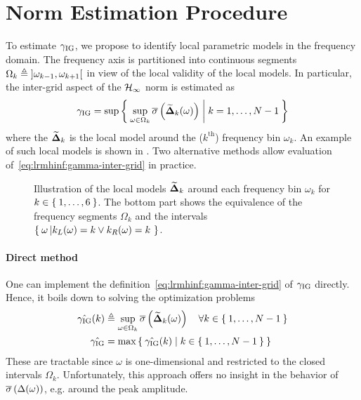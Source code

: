 \section{\Hinf{} Norm Estimation Procedure}
\label{sec:lrmhinf:LPMHinf}
To estimate $\gamma_{\mathrm{IG}}$, we propose to identify local parametric models in the frequency domain.
The frequency axis is partitioned into continuous segments $\Omega_k \triangleq \left]  \omega_{k-1} , \omega_{k+1}  \right[$ in view of the local validity of the local models.
In particular, the inter-grid aspect of the $\mathcal{H}_{\infty}$ norm is estimated as
\begin{equation}
  \gamma_{\mathrm{IG}} = 
    \sup \Set{ 
                \sup_{\omega \in \Omega_k} \ensuremath{ \overline{\sigma} \left( \widetilde{\mathbf{\Delta}}_k(\omega) \right) }
                |
                k = 1,\ldots,N-1
                }
   \label{eq:lrmhinf:gamma-inter-grid}
\end{equation}
where the $\widetilde{\mathbf{\Delta}}_{k}$ is the local model around the ($k^{\text{th}}$) frequency bin $\omega_k$.
An example of such local models is shown in .
Two alternative methods allow evaluation of~\eqref{eq:lrmhinf:gamma-inter-grid} in practice.

\begin{figure}
  \centering
  \setlength{\figurewidth}{0.68\columnwidth}
  \setlength{\figureheight}{0.68\figurewidth}
  
  \caption[Illustration of the local models.]{Illustration of the local models $\widetilde{\mathbf{\Delta}}_k$ around each frequency bin $\omega_k$ for $k\in\Set{1,\ldots,6}$.
  The bottom part shows the equivalence of the frequency segments $\Omega_k$ and the intervals $\Set{\omega \left| k_L(\omega) = k \vee k_R(\omega) = k \right.}$.}
\label{fig:lrmhinf:interpol-quantities}
\end{figure}

\paragraph*{Direct method}
One can implement the definition~\eqref{eq:lrmhinf:gamma-inter-grid} of $\gamma_{\mathrm{IG}}$ directly.
Hence, it boils down to solving the optimization problems
\begin{align}
  \hat{\gamma_{\mathrm{IG}}}(k) & \triangleq 
      \sup_{\omega \in \Omega_k}
       \overline{\sigma} \left( \widetilde{\mathbf{\Delta}}_k(\omega) \right) 
       \quad \forall k \in \Set{1,\ldots,N-1} \\
  \hat{\gamma_{\mathrm{IG}}} &= 
  \max \Set{
    \ensuremath{\hat{\gamma_{\mathrm{IG}}}}(k) 
    | 
    k \in \Set{1,\ldots,N-1}
  }
      \label{eq:lrmhinf:gamma-direct}
\end{align}
These are tractable since $\omega$ is one-dimensional and restricted to the closed intervals $\Omega_k$.
Unfortunately, this approach offers no insight in the behavior of $ \overline{\sigma} \left( \Delta(\omega) \right) $, e.g. around the peak amplitude.

